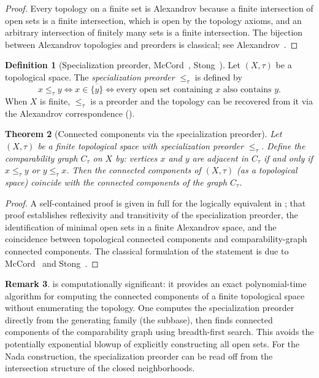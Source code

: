 \documentclass[11pt,a4paper]{article}
\theoremstyle{plain}
\newtheorem{theorem}{Theorem}[section]
\theoremstyle{definition}
\newtheorem{definition}[theorem]{Definition}
\newtheorem{remark}[theorem]{Remark}
\begin{document}
\begin{proof}
Every topology on a finite set is Alexandrov because a finite intersection of
open sets is a finite intersection, which is open by the topology axioms, and
an arbitrary intersection of finitely many sets is a finite intersection.  The
bijection between Alexandrov topologies and preorders is classical;
see Alexandrov~\cite{Alexandrov1937}.
\end{proof}

\begin{definition}[Specialization preorder, McCord~\cite{McCord1966},
Stong~\cite{Stong1966}]\label{def:specialization}
Let $(X, \tau)$ be a topological space.  The \emph{specialization preorder}
$\leq_\tau$ is defined by
\[
  x \leq_\tau y \iff x \in \overline{\{y\}} \iff
  \text{every open set containing } x \text{ also contains } y.
\]
When $X$ is finite, $\leq_\tau$ is a preorder and the topology can be recovered
from it via the Alexandrov correspondence ().
\end{definition}

\begin{theorem}[Connected components via the specialization preorder]%
\label{thm:connected-via-preorder}
Let $(X, \tau)$ be a finite topological space with specialization preorder
$\leq_\tau$.  Define the \emph{comparability graph} $C_\tau$ on $X$ by:
vertices $x$ and $y$ are adjacent in $C_\tau$ if and only if $x \leq_\tau y$
or $y \leq_\tau x$.  Then the connected components of $(X, \tau)$ (as a
topological space) coincide with the connected components of the graph $C_\tau$.
\end{theorem}

\begin{proof}
A self-contained proof is given in full for the logically equivalent
 in
; that proof establishes reflexivity and transitivity
of the specialization preorder, the identification of minimal open sets
in a finite Alexandrov space, and the coincidence between topological
connected components and comparability-graph connected components.  The
classical formulation of the statement is due to
McCord~\cite{McCord1966} and Stong~\cite{Stong1966}.
\end{proof}

\begin{remark}\label{rem:computational-significance}
 is computationally significant: it provides
an exact polynomial-time algorithm for computing the connected components of a
finite topological space without enumerating the topology.  One computes the
specialization preorder directly from the generating family (the subbase), then
finds connected components of the comparability graph using breadth-first
search.  This avoids the potentially exponential blowup of explicitly
constructing all open sets.  For the Nada construction, the specialization
preorder can be read off from the intersection structure of the closed
neighborhoods.
\end{remark}
\end{document}
